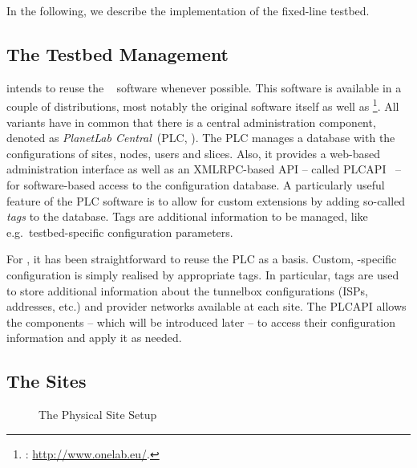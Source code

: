 In the following, we describe the implementation of the fixed-line  testbed.


\subsection{The Testbed Management}
\label{sub:The-Testbed-Management}

 intends to reuse the ~\cite{PBF+05} software whenever possible. This software is available in a couple of distributions, most notably the original  software itself as well as \footnote{: \url{http://www.onelab.eu/}.}. All variants have in common that there is a central administration component, denoted as \emph{PlanetLab Central}~(PLC, \cite{Hua06}). The PLC manages a database with the configurations of sites, nodes, users and slices. Also, it provides a web-based administration interface as well as an XMLRPC-based API -- called PLCAPI~\cite{PLCAPI} -- for software-based access to the configuration database. A particularly useful feature of the PLC software is to allow for custom extensions by adding so-called \emph{tags} to the database. Tags are additional information to be managed, like e.g.\ testbed-specific configuration parameters.

For , it has been straightforward to reuse the PLC as a basis. Custom, -specific configuration is simply realised by appropriate tags. In particular, tags are used to store additional information about the tunnelbox configurations (ISPs, addresses, etc.) and provider networks available at each site. The PLCAPI allows the  components -- which will be introduced later -- to access their configuration information and apply it as needed.


\subsection{The Sites}
\label{sub:The-Sites}

\begin{figure}
\begin{center}
\end{center}
\caption{The Physical Site Setup}
\label{cap:The-Site-Setup}
\end{figure}

